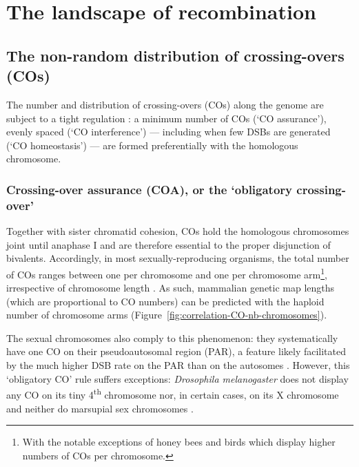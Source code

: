 \section{The landscape of recombination}

\subsection{The non-random distribution of crossing-overs (COs)}

The number and distribution of crossing-overs (COs) along the genome are subject to a tight regulation \citep[reviewed in][]{jones1984control, jones2006meiotic}: a minimum number of COs (‘CO assurance’), evenly spaced (‘CO interference’) — including when few DSBs are generated (‘CO homeostasis’) — are formed preferentially with the homologous chromosome.

\subsubsection{Crossing-over assurance (COA), or the ‘obligatory crossing-over’}
Together with sister chromatid cohesion, COs hold the homologous chromosomes joint until anaphase I \citep[reviewed in][]{roeder1997meiotic} and are therefore essential to the proper disjunction of bivalents.
Accordingly, in most sexually-reproducing organisms, the total number of COs ranges between one per chromosome and one per chromosome arm\footnote{With the notable exceptions of honey bees \citep{beye2006exceptionally} and birds \citep{groenen2009highdensity} which display higher numbers of COs per chromosome.}, irrespective of chromosome length \citep{dutrillaux1986role,pardo-manueldevillena2001recombination,dumas2002chromosomal,hillers2003chromosomewide,hassold2004cytological,dumont2017variation}.
As such, mammalian genetic map lengths (which are proportional to CO numbers) can be predicted with the haploid number of chromosome arms (Figure~\ref{fig:correlation-CO-nb-chromosomes}).

The sexual chromosomes also comply to this phenomenon: they systematically have one CO on their pseudoautosomal region (PAR), a feature likely facilitated by the much higher DSB rate on the PAR than on the autosomes \citep{kauppi2011distinct}.
However, this ‘obligatory CO’ rule suffers exceptions: \textit{Drosophila melanogaster} does not display any CO on its tiny 4\textsuperscript{th} chromosome nor, in certain cases, on its X chromosome \citep{orr-weaver1995meiosis, koehler1998human} and neither do marsupial sex chromosomes \citep{sharp1982sex}.\\

